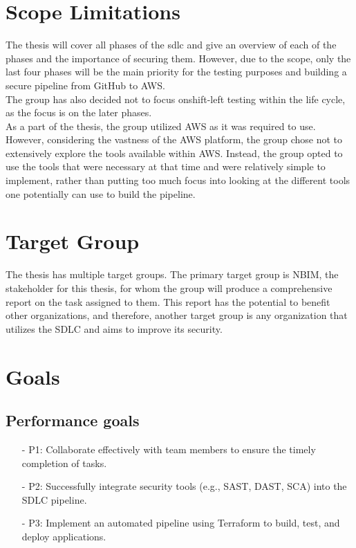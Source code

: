  
\section{Scope Limitations}
The thesis will cover all phases of the \acrlong{sdlc} and give an overview of each of the phases and the importance of securing them. However, due to the scope, only the last four phases will be the main priority for the testing purposes and building a secure pipeline from GitHub to AWS.
\\
The group has also decided not to focus on\gls{shift-left} testing within the life cycle, as the focus is on the later phases. 
\\
As a part of the thesis, the group utilized AWS as it was required to use. However, considering the vastness of the AWS platform, the group chose not to extensively explore the tools available within AWS. Instead, the group opted to use the tools that were necessary at that time and were relatively simple to implement, rather than putting too much focus into looking at the different tools one potentially can use to build the pipeline.

\section{Target Group}
The thesis has multiple target groups. The primary target group is NBIM, the stakeholder for this thesis, for whom the group will produce a comprehensive report on the task assigned to them. This report has the potential to benefit other organizations, and therefore, another target group is any organization that utilizes the SDLC and aims to improve its security.
\newpage
\section{Goals}
\subsection{Performance goals}
\begin{itemize}
    \item[-] P1: Collaborate effectively with team members to ensure the timely completion of tasks. 
    
    \item[-] P2: Successfully integrate security tools (e.g., SAST, DAST, SCA) into the SDLC pipeline. 
    
    \item[-] P3: Implement an automated pipeline using Terraform to build, test, and deploy applications.
\end{itemize}

